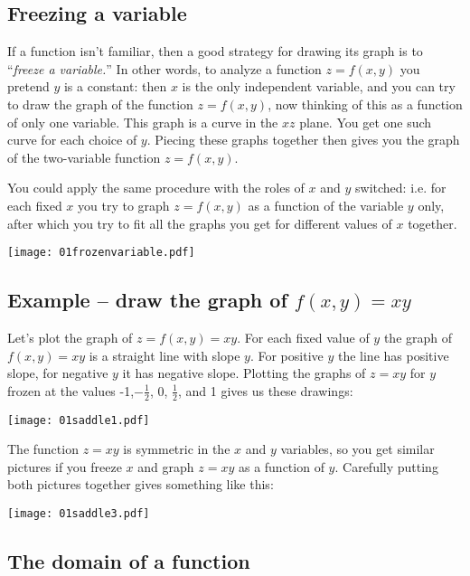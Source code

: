 \subsection{Freezing a variable}    %
\begin{multicols}{2}
If a function isn't familiar, then a good strategy for drawing its
graph is to ``\emph{freeze a variable.}'' In other words, to analyze
a function $ z=f(x,y) $ you pretend $ y $ is a constant: then $ x $
is the only independent variable, and you can try to draw the graph
of the function $ z=f(x,y) $, now thinking of this as a function of
only one variable. This graph is a curve in the $ xz $ plane. You
get one such curve for each choice of $ y $. Piecing these graphs
together then gives you the graph of the two-variable function $
z=f(x,y) $.

You could apply the same procedure with the roles of $ x $ and $ y $
switched: i.e. for each fixed $ x $ you try to graph $ z=f(x,y) $ as
a function of the variable $ y $ only, after which you try to fit
all the graphs you get for different values of $ x $ together.

\centerline{\texttt{[image: 01frozenvariable.pdf]} }
\end{multicols}



\subsection{Example -- draw the graph of $f(x,y) = xy$}    %
\label{sec:example-of-a-function3}
Let's plot the graph of $ z=f(x,y)=xy $.  For each fixed value of $ y $
the graph of $ f(x,y)=xy $ is a straight line with slope $ y $.  For
positive $ y $ the line has positive slope, for negative $ y $ it has
negative slope.   Plotting the graphs of $ z=xy $ for $ y $ frozen at
the values -1,$ -\frac{1}{2} $, $ 0 $, $ \frac{1}{2} $, and 1 gives us
these drawings:

\centerline{\texttt{[image: 01saddle1.pdf]}}


The function $ z=xy $ is symmetric in the $ x $ and $ y $ variables,
so you get similar pictures if you freeze $ x $ and graph $ z=xy $ as
a function of $ y $.  Carefully putting both pictures together gives
something like this:

\centerline{\texttt{[image: 01saddle3.pdf]}}



\subsection{The domain of a function}    %

